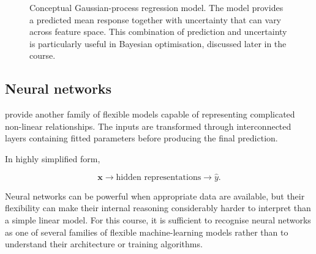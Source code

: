 \begin{figure}[htbp]
{%
    }

    \caption{
        Conceptual Gaussian-process regression model.
        The model provides a predicted mean response together with uncertainty
        that can vary across feature space.
        This combination of prediction and uncertainty is particularly useful
        in Bayesian optimisation, discussed later in the course.
    }
    \label{fig2-9:gaussian-process}
\end{figure}

\subsection{Neural networks}

 provide another family of flexible models capable of representing complicated non-linear relationships.
The inputs are transformed through interconnected layers containing fitted parameters before producing the final prediction.

In highly simplified form,

\begin{equation}
  \mathbf{x} \longrightarrow \text{hidden representations}
             \longrightarrow \hat{y}.
\end{equation}

Neural networks can be powerful when appropriate data are available, but their flexibility can make their internal reasoning considerably harder to interpret than a simple linear model.
For this course, it is sufficient to recognise neural networks as one of several families of flexible machine-learning models rather than to understand their architecture or training algorithms.

